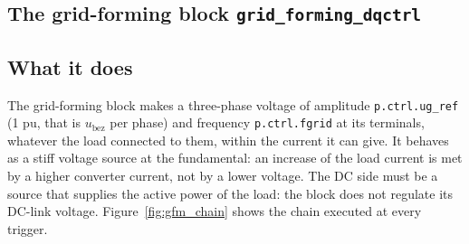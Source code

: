 \documentclass[11pt,a4paper]{scrartcl}
\newcommand{\ped}[1]{_{\mathrm{#1}}}
\newcommand{\code}[1]{\texttt{#1}}
\begin{document}
\begin{onehalfspace}
\section{The grid-forming block \code{grid\_forming\_dqctrl}}
\label{sec:gfm}

\subsection{What it does}
\label{sec:gfm_purpose}

The grid-forming block makes a three-phase voltage of amplitude \code{p.ctrl.ug\_ref} (1 pu, that is $u\ped{bez}$ per phase) and frequency \code{p.ctrl.fgrid} at its terminals, whatever the load connected to them, within the current it can give. It behaves as a stiff voltage source at the fundamental: an increase of the load current is met by a higher converter current, not by a lower voltage. The DC side must be a source that supplies the active power of the load: the block does not regulate its DC-link voltage. Figure~\ref{fig:gfm_chain} shows the chain executed at every trigger.


\end{onehalfspace}
\end{document}
